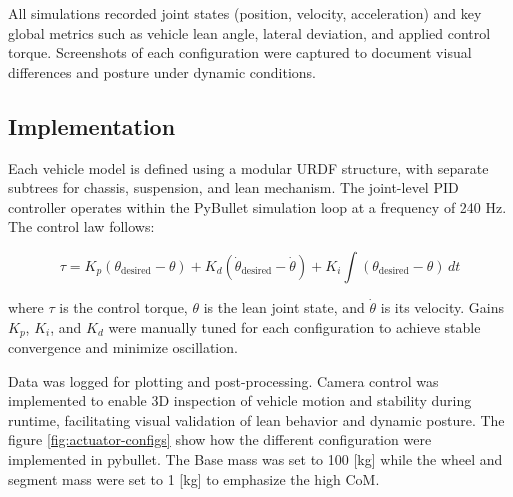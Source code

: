 All simulations recorded joint states (position, velocity, acceleration) and key global metrics such as vehicle lean angle, lateral deviation, and applied control torque. Screenshots of each configuration were captured to document visual differences and posture under dynamic conditions.

\subsection{Implementation}

Each vehicle model is defined using a modular URDF structure, with separate subtrees for chassis, suspension, and lean mechanism. The joint-level PID controller operates within the PyBullet simulation loop at a frequency of 240 Hz. The control law follows:

\[
\tau = K_p(\theta_{\text{desired}} - \theta) + K_d(\dot{\theta}_{\text{desired}} - \dot{\theta}) + K_i \int (\theta_{\text{desired}} - \theta) \, dt
\]

where $\tau$ is the control torque, $\theta$ is the lean joint state, and $\dot{\theta}$ is its velocity. Gains $K_p$, $K_i$, and $K_d$ were manually tuned for each configuration to achieve stable convergence and minimize oscillation.

Data was logged for plotting and post-processing. Camera control was implemented to enable 3D inspection of vehicle motion and stability during runtime, facilitating visual validation of lean behavior and dynamic posture. The figure \ref{fig:actuator-configs} show how the different configuration were implemented in pybullet. The Base mass was set to 100 [kg] while the wheel and segment mass were set to 1 [kg] to emphasize the high CoM.

\newpage

